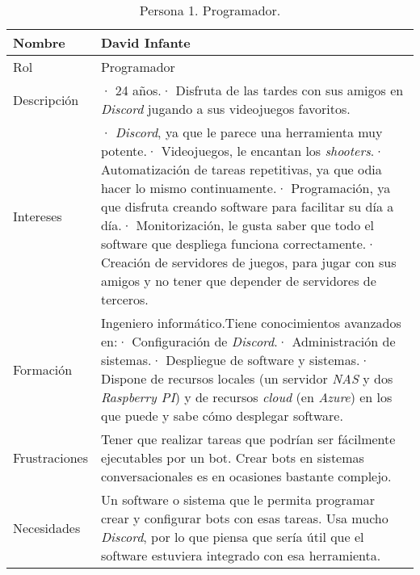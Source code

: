 \begin{table}[H]
    \centering
    \def\arraystretch{1.25}
    \begin{adjustbox}{max width=\textwidth}
    \begin{tabularx}{\textwidth}{|l|L|}
    \hline
        \textbf{Nombre} & \textbf{David Infante} \\ \hline
    \hline
        Rol & Programador \\ \hline
        Descripción & · 24 años.\linebreak · Disfruta de las tardes con sus amigos en \textit{Discord} jugando a sus videojuegos favoritos. \\ \hline
        Intereses & · \textit{Discord}, ya que le parece una herramienta muy potente.\linebreak · Videojuegos, le encantan los \textit{shooters}.\linebreak · Automatización de tareas repetitivas, ya que odia hacer lo mismo continuamente.\linebreak · Programación, ya que disfruta creando software para facilitar su día a día.\linebreak · Monitorización, le gusta saber que todo el software que despliega funciona correctamente.\linebreak · Creación de servidores de juegos, para jugar con sus amigos y no tener que depender de servidores de terceros. \\ \hline
        Formación & Ingeniero informático.\linebreak\linebreak Tiene conocimientos avanzados en:\linebreak · Configuración de \textit{Discord}.\linebreak · Administración de sistemas.\linebreak · Despliegue de software y sistemas.\linebreak · Dispone de recursos locales (un servidor \textit{NAS} y dos \textit{Raspberry PI}) y de recursos \textit{cloud} (en \textit{Azure}) en los que puede y sabe cómo desplegar software. \\ \hline
        Frustraciones & Tener que realizar tareas que podrían ser fácilmente ejecutables por un bot. Crear bots en sistemas conversacionales es en ocasiones bastante complejo. \\ \hline
        Necesidades & Un software o sistema que le permita programar crear y configurar bots con esas tareas. Usa mucho \textit{Discord}, por lo que piensa que sería útil que el software estuviera integrado con esa herramienta. \\ \hline
    \end{tabularx}
    \end{adjustbox}
    \caption{Persona 1. Programador.}
\end{table}


